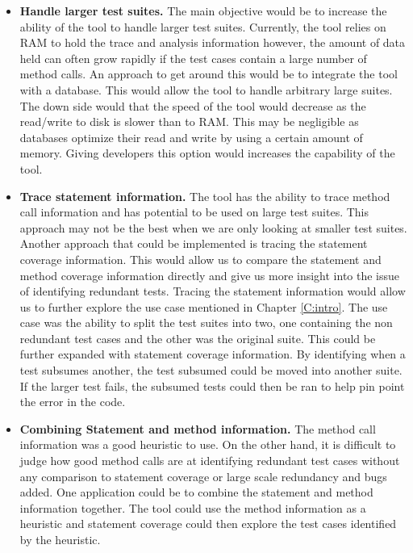 \begin{itemize}

\item \textbf{Handle larger test suites.} The main objective would be to increase the ability of the tool to handle larger test suites. Currently, the tool relies on RAM to hold the trace and analysis information however, the amount of data held can often grow rapidly if the test cases contain a large number of method calls. An approach to get around this would be to integrate the tool with a database.  This would allow the tool to handle arbitrary large suites. The down side would that the speed of the tool would decrease as the read/write to disk is slower than to RAM. This may be negligible as databases optimize their read and write by using a certain amount of memory. Giving developers this option would increases the capability of the tool. 

\item \textbf{Trace statement information.} The tool has the ability to trace method call information and has potential to be used on large test suites. This approach may not be the best when we are only looking at smaller test suites. Another approach that could be implemented is tracing the statement coverage information. This would allow us to compare the statement and method coverage information directly and give us more insight into the issue of identifying redundant tests. Tracing the statement information would allow us to further explore the use case mentioned in Chapter \ref{C:intro}. The use case was the ability to split the test suites into two, one containing the non redundant test cases and the other was the original suite. This could be further expanded with statement coverage information. By identifying when a test subsumes another, the test subsumed could be moved into another suite. If the larger test fails, the subsumed tests could then be ran to help pin point the error in the code.

\item \textbf{Combining Statement and method information.} The method call information was a good heuristic to use. On the other hand, it is difficult to judge how good method calls are at identifying redundant test cases without any comparison to statement coverage or large scale redundancy and bugs added. One application could be to combine the statement and method information together. The tool could use the method information as a heuristic and statement coverage could then explore the test cases identified by the heuristic.

\end{itemize}

